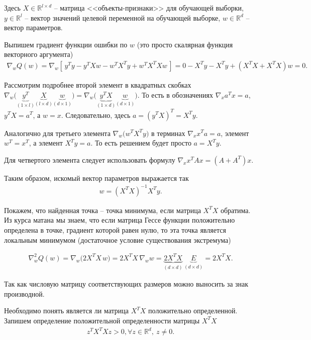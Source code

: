 \documentclass[%
	11pt,
	a4paper,
	utf8,
		]{article}
\begin{document}
Здесь $ X \in \mathbb{R}^{l \times d} $ -- матрица <<объекты-признаки>> для обучающей выборки, $ y \in \mathbb{R}^l $ -- вектор значений целевой переменной на обучающей выборке, $ w \in \mathbb{R}^d $ -- вектор параметров.

Выпишем градиент функции ошибки по $ w $ (это просто скалярная функция векторного аргумента)
\begin{align*}
	\nabla_w Q(w) = \nabla_w [\, y^T y - y^T X w - w^T X^T y + w^T X^T X w \,] = 0 - X^T y - X^T y + (X^T X + X^T X) w = 0.
\end{align*}

Рассмотрим подробнее второй элемент в квадратных скобках $ \nabla_w \big(\underbrace{y^T}_{(1 \times l)} \underbrace{X}_{( l \times d )} \underbrace{w}_{( d \times 1)} \big) = \nabla_w \big( \underbrace{y^T X}_{(1 \times d)} \underbrace{w}_{( d \times 1)} \big) $. То есть в обозначениях $ \nabla_x a^T x = a $, $ y^T X = a^T $, а $ w = x $. Следовательно, здесь $ a = (y^T X)^T = X^T y $.

Аналогично для третьего элемента $ \nabla_w \big( w^T X^T y \big) $ в терминах $ \nabla_x x^T a = a $, элемент $ w^T = x^T $, а элемент $ X^T y = a $. То есть решением будет просто $ a = X^T y $.

Для четвертого элемента следует использовать формулу $ \nabla_x x^T A x = (A + A^T) x $.

Таким образом, искомый вектор параметров выражается так
\begin{align*}
	w = (X^T X)^{-1} X^T y.
\end{align*}

Покажем, что найденная точка -- точка минимума, если матрица $ X^T X $ обратима. Из курса матана мы знаем, что если матрица Гессе функции положительно определена в точке, градиент которой равен нулю, то эта точка является локальным минимумом (достаточное условие существования экстремума)

\begin{align*}
	\nabla_w^2 Q(w) = \nabla_w \big( 2X^T X\,w \big) = 2 X^T X \, \nabla_w w = \underbrace{2 X^T X}_{( d \times d )} \, \underbrace{E}_{(d \times d)} = 2 X^T X.
\end{align*}

Так как числовую матрицу соответствующих размеров можно выносить за знак производной.

Необходимо понять является ли матрица $ X^T X $ положительно определенной. Запишем определение положительной определенности матрицы $ X^T X $
\begin{align*}
	z^T X^T X z > 0, \forall z \in \mathbb{R}^d, \ z \neq 0.
\end{align*}
\end{document}
